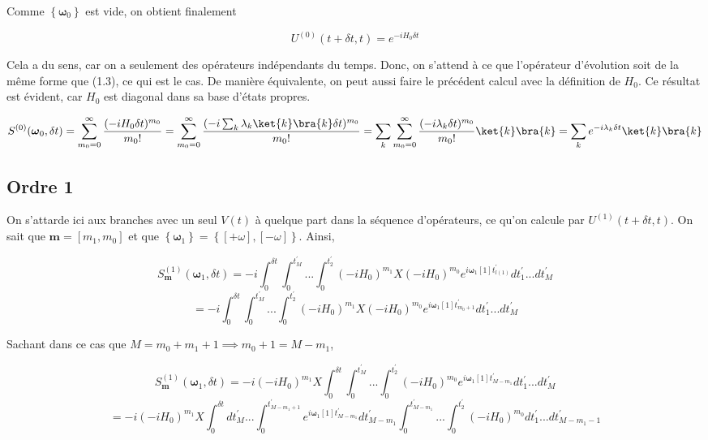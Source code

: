 Comme $\left\{\boldsymbol{\omega}_0\right\}$ est vide, on obtient finalement

\begin{equation*}
    U^{(0)}(t+\delta t, t) = e^{-iH_0\delta t}
\end{equation*}

Cela a du sens, car on a seulement des opérateurs indépendants du temps. Donc, on s'attend à ce que l'opérateur d'évolution soit de la même forme que (1.3), ce qui est le cas. De manière équivalente, on peut aussi faire le précédent calcul avec la définition de $H_0$. Ce résultat est évident, car $H_0$ est diagonal dans sa base d'états propres.

\begin{equation*}
    S^{(0)}(\boldsymbol{\omega}_0, \delta t) = \sum_{m_0 = 0}^{\infty}\frac{(-iH_0\delta t)^{m_0}}{m_0!} = \sum_{m_0 = 0}^{\infty}\frac{(-i\sum_{k}\lambda_k \ket{k}\bra{k}\delta t)^{m_0}}{m_0!} = \sum_{k}\sum_{m_0 = 0}^{\infty}\frac{(-i\lambda_k\delta t)^{m_0}}{m_0!}\ket{k}\bra{k} = \sum_{k}e^{-i\lambda_k\delta t}\ket{k}\bra{k}
\end{equation*}


\subsection{Ordre 1}
On s'attarde ici aux branches avec un seul $V(t)$ à quelque part dans la séquence d'opérateurs, ce qu'on calcule par $ U^{(1)}(t+\delta t, t)$. On sait que $\boldsymbol{m} = [m_1, m_0]$ et que $\left\{\boldsymbol{\omega}_1\right\} = \left\{[+\omega], [-\omega]\right\}$. Ainsi, 

\begin{equation*}
    S^{(1)}_{\boldsymbol{m}}(\boldsymbol{\omega}_1, \delta t) = -i\int_{0}^{\delta t}\int_{0}^{t_M^{'}}... \int_{0}^{t_2^{'}}(-iH_0)^{m_1}X(-iH_0)^{m_0} e^{i\boldsymbol{\omega}_1[1]t^{'}_{l(1)}}dt_1^{'} ... dt_M^{'}
\end{equation*}
\begin{equation*}
    = -i\int_{0}^{\delta t}\int_{0}^{t_M^{'}}... \int_{0}^{t_2^{'}}(-iH_0)^{m_1}X(-iH_0)^{m_0} e^{i\boldsymbol{\omega}_1[1]t^{'}_{m_0+1}}dt_1^{'} ... dt_M^{'}
\end{equation*}

Sachant dans ce cas que $M = m_0 + m_1 + 1 \implies m_0 + 1 = M-m_1$,

\begin{equation*}
    S^{(1)}_{\boldsymbol{m}}(\boldsymbol{\omega}_1, \delta t) = -i (-iH_0)^{m_1}X
    \int_{0}^{\delta t}\int_{0}^{t_M^{'}}... \int_{0}^{t_2^{'}}(-iH_0)^{m_0} e^{i\boldsymbol{\omega}_1[1]t^{'}_{M-m_1}}dt_1^{'} ... dt_M^{'}
\end{equation*}
\begin{equation*}
    = -i (-iH_0)^{m_1}X
    \int_{0}^{\delta t}dt_M^{'} ... \int_{0}^{t^{'}_{M-m_1+1}}e^{i\boldsymbol{\omega}_1[1]t^{'}_{M-m_1}} dt_{M-m_1}^{'}\int_{0}^{t^{'}_{M-m_1}}... \int_{0}^{t_2^{'}}(-iH_0)^{m_0} dt_1^{'} ... dt_{M - m_1 - 1}^{'}
\end{equation*}

